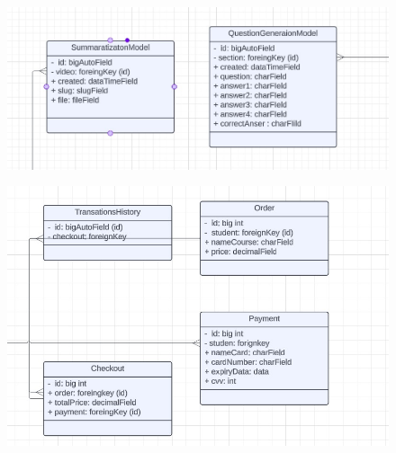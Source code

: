 \begin{figure}[h!]
	\centering
	\includegraphics[width=\textwidth]{figures/class-question.jpeg}
\end{figure}

\begin{figure}[h!]
	\centering
	\includegraphics[width=\textwidth]{figures/class-checkout.jpeg}
\end{figure}
